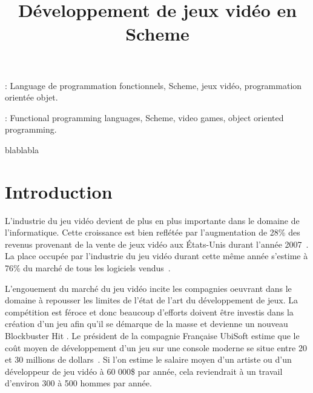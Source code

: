 \documentclass[12pt,oneside,letterpaper,francais]{book}
\title{Développement de jeux vidéo en Scheme}
\begin{document}
\setcounter{page}{1}
 \PagesCouverture

\resume


\vspace{2em}

: Language de programmation fonctionnels,
Scheme, jeux vidéo, programmation orientée objet.

\abstract



\vspace{2em}

: Functional programming languages, Scheme,
video games, object oriented programming.



 
\tabledesmatieres


\listedesfigures


\remerciements

blablabla

% 

\debutchapitres

\chapter{Introduction}
\label{Chap:Intro}

L'industrie du jeu vidéo devient de plus en plus importante dans le
domaine de l'informatique. Cette croissance est bien reflétée par
l'augmentation de 28\% des revenus provenant de la vente de jeux vidéo
aux États-Unis durant l'année 2007~\cite{NPD_Games_2007}. La place
occupée par l'industrie du jeu vidéo durant cette même année s'estime
à 76\% du marché de tous les logiciels vendus~\cite{NPD_Soft_2008}. 

L'engouement du marché du jeu vidéo incite les compagnies oeuvrant
dans le domaine à repousser les limites de l'état de l'art du
développement de jeux. La compétition est féroce et donc beaucoup
d'efforts doivent être investis dans la création d'un jeu afin qu'il
se démarque de la masse et devienne un nouveau \og Blockbuster Hit
\fg. Le président de la compagnie Française UbiSoft estime que le coût
moyen de développement d'un jeu sur une console moderne se situe entre
20 et 30 millions de dollars~\cite{cbc_ubisoft}. Si l'on estime le
salaire moyen d'un artiste ou d'un développeur de jeu vidéo à 60
000\$ par année, cela reviendrait à un travail d'environ 300 à 500
hommes par année.
\end{document}
